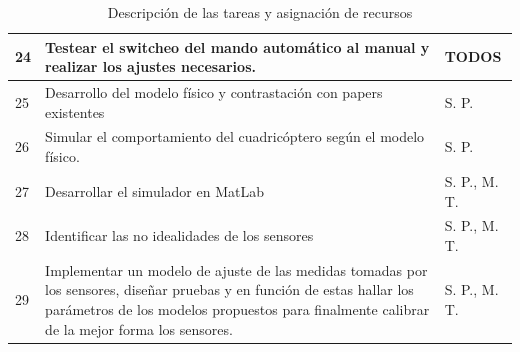 \documentclass[spanish,12pt,a4paper,titlepage]{report}
\begin{document}
\begin{table}[H]
\begin{tabular}{|p{50pt}|p{250pt}|p{100pt}|}
24  & Testear el switcheo del mando automático al manual y realizar los ajustes necesarios. & TODOS \\ \hline
25  & Desarrollo del modelo físico y contrastación con papers existentes & S. P. \\ \hline
26  & Simular el comportamiento del cuadricóptero según el modelo físico. & S. P. \\ \hline
27  & Desarrollar el simulador en MatLab & S. P., M. T. \\ \hline
28  & Identificar las no idealidades de los sensores & S. P., M. T. \\ \hline
29  & Implementar un modelo de ajuste de las medidas tomadas por los sensores, diseñar pruebas y en función de estas hallar los parámetros de los modelos propuestos para finalmente calibrar de la mejor forma los sensores. & S. P., M. T. \\ \hline
\end{tabular} 
\caption{Descripción de las tareas y asignación de recursos}
\label{tab:tareas_y_recursos}
\end{table}
\end{document}
